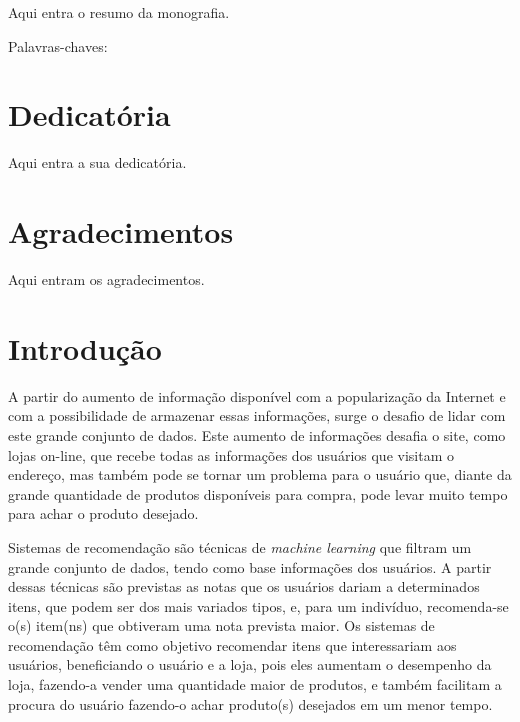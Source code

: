 \documentclass[12pt,a4paper,header]{abnt}
\begin{document}
\begin{resumo}
Aqui entra o resumo da monografia.

\vspace{1cm}
\noindent Palavras-chaves: 


\end{resumo}



\chapter*{Dedicatória}
Aqui entra a sua dedicatória. 



\chapter*{Agradecimentos}
Aqui entram os agradecimentos. 



\tableofcontents{}
\listoffigures
\listoftables



\chapter{Introdução} \label{cap:introducao}

A partir do aumento de informação disponível com a popularização da Internet e com a possibilidade de armazenar essas informações, surge o desafio de lidar com este grande conjunto de dados\cite{isinkaye2015recommendation}. Este aumento de informações desafia o site, como lojas on-line, que recebe todas as informações dos usuários que visitam o endereço, mas também pode se tornar um problema para o usuário que, diante da grande quantidade de produtos disponíveis para compra, pode levar muito tempo para achar o produto desejado\cite{mild2002collaborative}.

Sistemas de recomendação são técnicas de \textit{machine learning} que filtram um grande conjunto de dados, tendo como base informações dos usuários\cite{takahashi2015estudo}. A partir dessas técnicas são previstas as notas que os usuários dariam a determinados itens, que podem ser dos mais variados tipos, e, para um indivíduo, recomenda-se o(s) item(ns) que obtiveram uma nota prevista maior\cite{shapira2011recommender}. Os sistemas de recomendação têm como objetivo recomendar itens que interessariam aos usuários\cite{melville2011recommender}, beneficiando o usuário e a loja, pois eles aumentam o desempenho da loja, fazendo-a vender uma quantidade maior de produtos, e também facilitam a procura do usuário fazendo-o achar produto(s) desejados em um menor tempo\cite{isinkaye2015recommendation}. 
\end{document}
